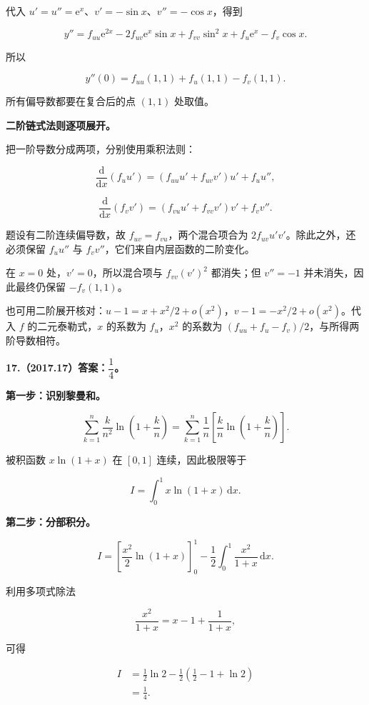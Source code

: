 \documentclass[UTF8,11pt,fontset=windows]{ctexart}
\begin{document}
代入 $u' = u''=\mathrm e^x$、$v'=-\sin x$、$v''=-\cos x$，得到

$$
y''=f_{uu}\mathrm e^{2x}-2f_{uv}\mathrm e^x\sin x
+f_{vv}\sin^2x+f_u\mathrm e^x-f_v\cos x.
$$

所以

$$
y''(0)=f_{uu}(1,1)+f_u(1,1)-f_v(1,1).
$$

所有偏导数都要在复合后的点 $(1,1)$ 处取值。

\textbf{二阶链式法则逐项展开。}

把一阶导数分成两项，分别使用乘积法则：

$$
\frac{\mathrm d}{\mathrm dx}(f_u u')
=(f_{uu}u'+f_{uv}v')u'+f_u u'',
$$

$$
\frac{\mathrm d}{\mathrm dx}(f_v v')
=(f_{vu}u'+f_{vv}v')v'+f_v v''.
$$

题设有二阶连续偏导数，故 $f_{uv}=f_{vu}$，两个混合项合为 $2f_{uv}u'v'$。除此之外，还必须保留 $f_u u''$ 与 $f_v v''$，它们来自内层函数的二阶变化。

在 $x=0$ 处，$v'=0$，所以混合项与 $f_{vv}(v')^2$ 都消失；但 $v''=-1$ 并未消失，因此最终仍保留 $-f_v(1,1)$。

也可用二阶展开核对：$u-1=x+x^2/2+o(x^2)$，$v-1=-x^2/2+o(x^2)$。代入 $f$ 的二元泰勒式，$x$ 的系数为 $f_u$，$x^2$ 的系数为 $(f_{uu}+f_u-f_v)/2$，与所得两阶导数相符。

\clearpage

\textbf{17.（2017.17）答案：$\dfrac14$。}

\textbf{第一步：识别黎曼和。}

$$
\sum_{k=1}^n\frac{k}{n^2}\ln\left(1+\frac kn\right)
=\sum_{k=1}^n\frac1n\left[\frac kn\ln\left(1+\frac kn\right)\right].
$$

被积函数 $x\ln(1+x)$ 在 $[0,1]$ 连续，因此极限等于

$$
I=\int_0^1x\ln(1+x)\,\mathrm dx.
$$

\textbf{第二步：分部积分。}

$$
I=\left[\frac{x^2}{2}\ln(1+x)\right]_0^1
-\frac12\int_0^1\frac{x^2}{1+x}\,\mathrm dx.
$$

利用多项式除法

$$
\frac{x^2}{1+x}=x-1+\frac1{1+x},
$$

可得

$$
\begin{aligned}
I&=\frac12\ln2-\frac12\left(\frac12-1+\ln2\right)\\
&=\frac14.
\end{aligned}
$$
\end{document}

